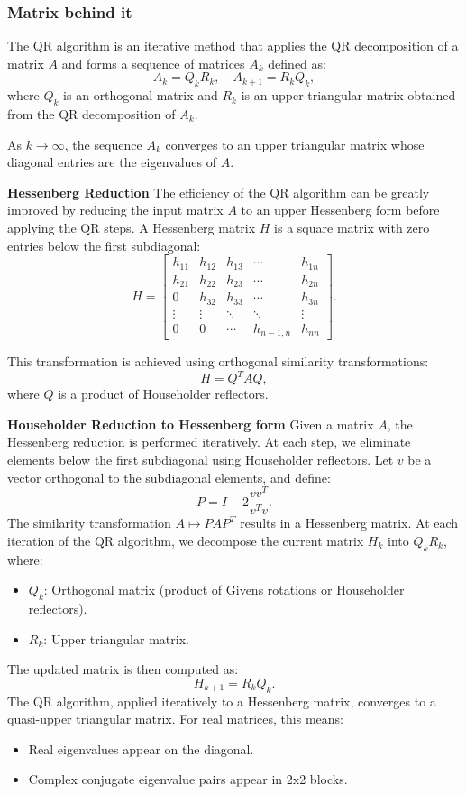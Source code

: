 \documentclass[12pt,oneside,letterpaper,english]{article}
\begin{document}
\subsubsection{Matrix behind it}
The QR algorithm is an iterative method that applies the QR decomposition of a matrix \( A \) and forms a sequence of matrices \( A_k \) defined as:
\[
A_k = Q_k R_k, \quad A_{k+1} = R_k Q_k,
\]
where \( Q_k \) is an orthogonal matrix and \( R_k \) is an upper triangular matrix obtained from the QR decomposition of \( A_k \).

As \( k \to \infty \), the sequence \( A_k \) converges to an upper triangular matrix whose diagonal entries are the eigenvalues of \( A \).

\textbf{Hessenberg Reduction}
The efficiency of the QR algorithm can be greatly improved by reducing the input matrix \( A \) to an upper Hessenberg form before applying the QR steps. A Hessenberg matrix \( H \) is a square matrix with zero entries below the first subdiagonal:
\[
H = 
\begin{bmatrix}
h_{11} & h_{12} & h_{13} & \cdots & h_{1n} \\
h_{21} & h_{22} & h_{23} & \cdots & h_{2n} \\
0 & h_{32} & h_{33} & \cdots & h_{3n} \\
\vdots & \vdots & \ddots & \ddots & \vdots \\
0 & 0 & \cdots & h_{n-1,n} & h_{nn}
\end{bmatrix}.
\]

This transformation is achieved using orthogonal similarity transformations:
\[
H = Q^T A Q,
\]
where \( Q \) is a product of Householder reflectors.

\textbf{Householder Reduction to Hessenberg form}
Given a matrix \( A \), the Hessenberg reduction is performed iteratively. At each step, we eliminate elements below the first subdiagonal using Householder reflectors. Let \( v \) be a vector orthogonal to the subdiagonal elements, and define:
\[
P = I - 2\frac{vv^T}{v^T v}.
\]
The similarity transformation \( A \mapsto P A P^T \) results in a Hessenberg matrix.
At each iteration of the QR algorithm, we decompose the current matrix \( H_k \) into \( Q_k R_k \), where:
\begin{itemize}
    \item \( Q_k \): Orthogonal matrix (product of Givens rotations or Householder reflectors).
    \item \( R_k \): Upper triangular matrix.
\end{itemize}
The updated matrix is then computed as:
\[
H_{k+1} = R_k Q_k.
\]
The QR algorithm, applied iteratively to a Hessenberg matrix, converges to a quasi-upper triangular matrix. For real matrices, this means:
\begin{itemize}
    \item Real eigenvalues appear on the diagonal.
    \item Complex conjugate eigenvalue pairs appear in 2x2 blocks.
\end{itemize}
\end{document}
